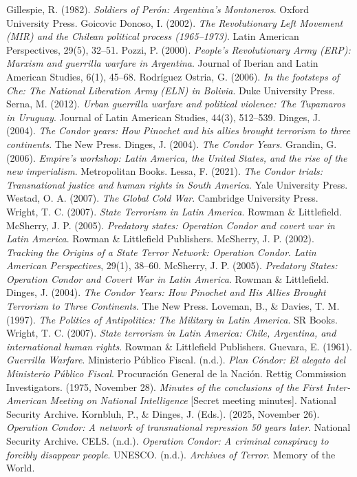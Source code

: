 
\begin{referencelist}
   Gillespie, R. (1982). \emph{Soldiers of Perón: Argentina's Montoneros}. Oxford University Press.
   Goicovic Donoso, I. (2002). \emph{The Revolutionary Left Movement (MIR) and the Chilean political process (1965–1973)}. Latin American Perspectives, 29(5), 32–51.
   Pozzi, P. (2000). \emph{People's Revolutionary Army (ERP): Marxism and guerrilla warfare in Argentina}. Journal of Iberian and Latin American Studies, 6(1), 45–68.
   Rodríguez Ostria, G. (2006). \emph{In the footsteps of Che: The National Liberation Army (ELN) in Bolivia}. Duke University Press.
   Serna, M. (2012). \emph{Urban guerrilla warfare and political violence: The Tupamaros in Uruguay}. Journal of Latin American Studies, 44(3), 512–539.
   Dinges, J. (2004). \emph{The Condor years: How Pinochet and his allies brought terrorism to three continents}. The New Press.
   Dinges, J. (2004). \emph{The Condor Years}.
   Grandin, G. (2006). \emph{Empire's workshop: Latin America, the United States, and the rise of the new imperialism}. Metropolitan Books.
   Lessa, F. (2021). \emph{The Condor trials: Transnational justice and human rights in South America}. Yale University Press.
   Westad, O. A. (2007). \emph{The Global Cold War}. Cambridge University Press.
   Wright, T. C. (2007). \emph{State Terrorism in Latin America}. Rowman \& Littlefield.
   McSherry, J. P. (2005). \emph{Predatory states: Operation Condor and covert war in Latin America}. Rowman \& Littlefield Publishers.
   McSherry, J. P. (2002). \emph{Tracking the Origins of a State Terror Network: Operation Condor}. \emph{Latin American Perspectives}, 29(1), 38–60.
   McSherry, J. P. (2005). \emph{Predatory States: Operation Condor and Covert War in Latin America}. Rowman \& Littlefield.
   Dinges, J. (2004). \emph{The Condor Years: How Pinochet and His Allies Brought Terrorism to Three Continents}. The New Press.
   Loveman, B., \& Davies, T. M. (1997). \emph{The Politics of Antipolitics: The Military in Latin America}. SR Books.
   Wright, T. C. (2007). \emph{State terrorism in Latin America: Chile, Argentina, and international human rights}. Rowman \& Littlefield Publishers.
   Guevara, E. (1961). \emph{Guerrilla Warfare}.
   Ministerio Público Fiscal. (n.d.). \emph{Plan Cóndor: El alegato del Ministerio Público Fiscal}. Procuración General de la Nación.
   Rettig Commission Investigators. (1975, November 28). \emph{Minutes of the conclusions of the First Inter-American Meeting on National Intelligence} [Secret meeting minutes]. National Security Archive.
   Kornbluh, P., \& Dinges, J. (Eds.). (2025, November 26). \emph{Operation Condor: A network of transnational repression 50 years later}. National Security Archive.
   CELS. (n.d.). \emph{Operation Condor: A criminal conspiracy to forcibly disappear people}.
   UNESCO. (n.d.). \emph{Archives of Terror}. Memory of the World.
\end{referencelist}
